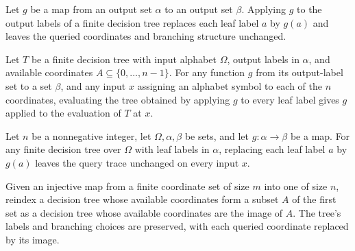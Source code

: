 \begin{definition}
\label{FABL.FiniteDecisionTree.mapOutput}
\leanok
{}
Let $g$ be a map from an output set $\alpha$ to an output set $\beta$. Applying $g$ to
the output labels of a finite decision tree replaces each leaf label $a$ by $g(a)$ and
leaves the queried coordinates and branching structure unchanged.
\end{definition}

\begin{theorem}
\label{FABL.FiniteDecisionTree.eval_mapOutput}
\leanok
{}
Let $T$ be a finite decision tree with input alphabet $\Omega$, output labels in $\alpha$, and
available coordinates $A\subseteq\{0,\ldots,n-1\}$. For any function $g$ from its
output-label set to a set $\beta$, and any input $x$ assigning an alphabet symbol to each
of the $n$ coordinates, evaluating the tree obtained by applying $g$ to every leaf label
gives $g$ applied to the evaluation of $T$ at $x$.
\end{theorem}

\begin{theorem}
\label{FABL.FiniteDecisionTree.queryTrace_mapOutput}
\leanok
{}
Let $n$ be a nonnegative integer, let $\Omega,\alpha,\beta$ be sets, and let
$g:\alpha\to\beta$ be a map. For any finite decision tree over $\Omega$ with leaf labels
in $\alpha$, replacing each leaf label $a$ by $g(a)$ leaves the query trace unchanged on
every input $x$.
\end{theorem}

\begin{definition}
\label{FABL.FiniteDecisionTree.reindex}
\leanok
{}
Given an injective map from a finite coordinate set of size $m$ into one of size $n$,
reindex a decision tree whose available coordinates form a subset $A$ of the first set
as a decision tree whose available coordinates are the image of $A$. The tree's labels
and branching choices are preserved, with each queried coordinate replaced by its image.
\end{definition}

